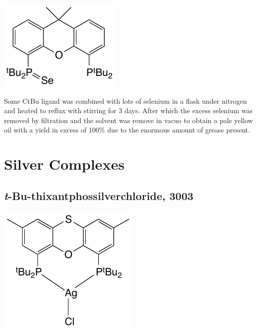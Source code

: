\begin{structure}[h]
\begin{center}
\includegraphics{../Structures/CtBuSe.pdf}
\end{center}
\end{structure}

Some CtBu ligand was combined with lots of selenium in a flask under nitrogen and heated to reflux with stirring for 3 days.  After which the excess selenium was removed by filtration and the solvent was remove in vacuo to obtain a pale yellow oil with a yield in excess of 100\% due to the enormous amount of grease present.

\section{Silver Complexes}
\label{section:experimental:silver}



\subsection*{\emph{t}-Bu-thixantphossilverchloride, 3003} 

\begin{structure}[h]
\begin{center}
\includegraphics{../Structures/StBuSilverChloride.pdf}
\end{center}
\end{structure}

